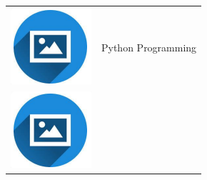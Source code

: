 \documentclass{article}
\begin{document}
\begin{paracol}{2}
        \begin{tabular}{ll}
         \begin{minipage}{0.1\linewidth}
         \includegraphics[width=\linewidth]{picon.png}
         \end{minipage} & {{Python Programming}} \\[10pt]
         \begin{minipage}{0.1\linewidth}
         \includegraphics[width=\linewidth]{picon.png}

\end{minipage}
\end{tabular}
\end{paracol}
\end{document}
